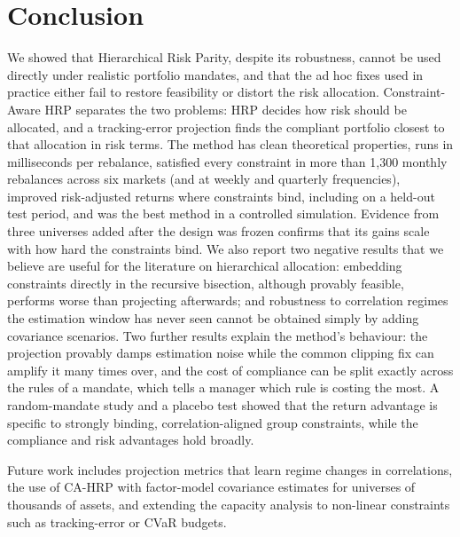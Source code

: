 \documentclass[11pt]{article}
\begin{document}
\begin{abstract}
\medskip\noindent\textbf{Keywords:} hierarchical risk parity, portfolio optimisation,
constrained allocation, tracking error, robust estimation, convex optimisation.
\end{abstract}






\FloatBarrier
\section{Conclusion}\label{sec:conclusion}
We showed that Hierarchical Risk Parity, despite its robustness, cannot be used directly
under realistic portfolio mandates, and that the ad hoc fixes used in practice either fail
to restore feasibility or distort the risk allocation. Constraint-Aware HRP separates the
two problems: HRP decides how risk should be allocated, and a tracking-error projection
finds the compliant portfolio closest to that allocation in risk terms. The method has
clean theoretical properties, runs in milliseconds per rebalance, satisfied every
constraint in more than 1{,}300 monthly rebalances across six markets (and at weekly and
quarterly frequencies), improved risk-adjusted returns where constraints bind, including on
a held-out test period, and was the best method in a controlled simulation. Evidence from
three universes added after the design was frozen confirms that its gains scale with how
hard the constraints bind. We also report two negative results that we believe are useful
for the literature on hierarchical allocation: embedding constraints directly in the
recursive bisection, although provably feasible, performs worse than projecting afterwards;
and robustness to correlation regimes the estimation window has never seen cannot be
obtained simply by adding covariance scenarios. Two further results explain the method's behaviour: the
projection provably damps estimation noise while the common clipping fix can amplify it many
times over, and the cost of compliance can be split exactly across the rules of a mandate,
which tells a manager which rule is costing the most. A random-mandate study and a placebo
test showed that the return advantage is specific to strongly binding, correlation-aligned
group constraints, while the compliance and risk advantages hold broadly.

Future work includes projection metrics that learn regime changes in correlations, the use
of CA-HRP with factor-model covariance estimates for universes of thousands of assets, and
extending the capacity analysis to non-linear constraints such as tracking-error or CVaR
budgets.
\end{document}
